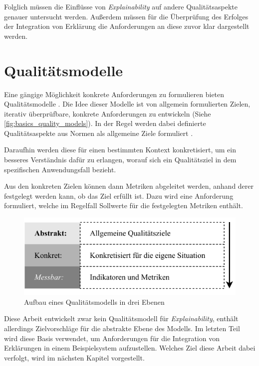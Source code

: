 Folglich müssen die Einflüsse von \textit{Explainability} auf andere Qualitätsaspekte genauer untersucht werden. Außerdem müssen für die Überprüfung des Erfolges der Integration von Erklärung die Anforderungen an diese zuvor klar dargestellt werden.

\section{Qualitätsmodelle}
\label{sec:basics_quality_models}

Eine gängige Möglichkeit konkrete Anforderungen zu formulieren bieten Qualitätsmodelle \cite{schneider2012abenteuer}. Die Idee dieser Modelle ist von allgemein formulierten Zielen, iterativ überprüfbare, konkrete Anforderungen zu entwickeln (Siehe \autoref{fig:basics_quality_models}). In der Regel werden dabei definierte Qualitätsaspekte aus Normen als allgemeine Ziele formuliert \cite[vgl.][]{schneider2012abenteuer}.

Daraufhin werden diese für einen bestimmten Kontext konkretisiert, um ein besseres Verständnis dafür zu erlangen, worauf sich ein Qualitätsziel in dem spezifischen Anwendungsfall bezieht.

Aus den konkreten Zielen können dann Metriken abgeleitet werden, anhand derer festgelegt werden kann, ob das Ziel erfüllt ist. Dazu wird eine Anforderung formuliert, welche im Regelfall Sollwerte für die festgelegten Metriken enthält.

\begin{figure}[htb!]
    \centering
    \includegraphics{contents/02_basics/res/quality_models.pdf}
    \caption{Aufbau eines Qualitätsmodells in drei Ebenen \cite[S. 34, ][]{schneider2012abenteuer}}
    \label{fig:basics_quality_models}
\end{figure}

Diese Arbeit entwickelt zwar kein Qualitätsmodell für \textit{Explainability}, enthält allerdings Zielvorschläge für die abstrakte Ebene des Modells. Im letzten Teil wird diese Basis verwendet, um Anforderungen für die Integration von Erklärungen in einem Beispielsystem aufzustellen. Welches Ziel diese Arbeit dabei verfolgt, wird im nächsten Kapitel vorgestellt.



